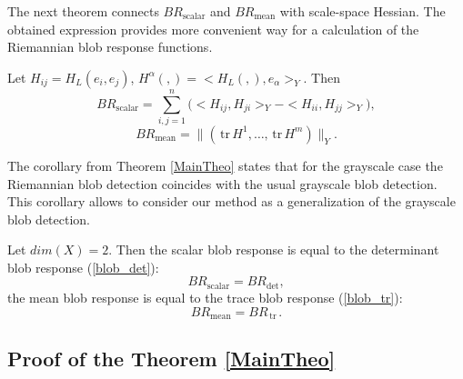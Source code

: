 \documentclass{llncs}
\newcommand{\FRScalar}{BR_{\mathrm{scalar}}}
\newcommand{\FRMean}{BR_{\mathrm{mean}}}
\newcommand {\tr}{{\,}\mathrm{tr}{\,}}
\begin{document}
The next theorem connects $\FRScalar$ and $\FRMean$ with scale-space Hessian. The obtained expression provides more convenient way for a calculation of the Riemannian blob response functions.

\begin{theorem} \label{MainTheo}
Let $H_{ij}=H_L (e_i,e_j)$, $H^\alpha (,) =<H_L (,),e_\alpha>_Y$. Then
\begin{equation*}\FRScalar=\sum_{i,j=1}^{n} \Big( <H_{ij},H_{ji}>_Y-<H_{ii},H_{jj}>_Y \Big) ,\end{equation*}
\begin{equation*}\FRMean=\| (\tr H^1,\dots,\tr H^m )\|_Y.\end{equation*}
\end{theorem}

The corollary from Theorem \ref{MainTheo} states that for the grayscale case the Riemannian blob detection coincides with the usual grayscale blob detection. This corollary allows to consider our method as a generalization of the grayscale blob detection.

\begin{corollary}\label{GrayscaleCol}
Let $dim(X)=2$. Then the scalar blob response is equal to the determinant blob response (\ref{blob_det}):
\begin{equation*}\FRScalar=BR_{\det},\end{equation*}
the mean blob response is equal to the trace blob response (\ref{blob_tr}):
\begin{equation*}\FRMean=BR_{\tr}.\end{equation*}
\end{corollary}

\subsection{Proof of the Theorem \ref{MainTheo}}
\end{document}
